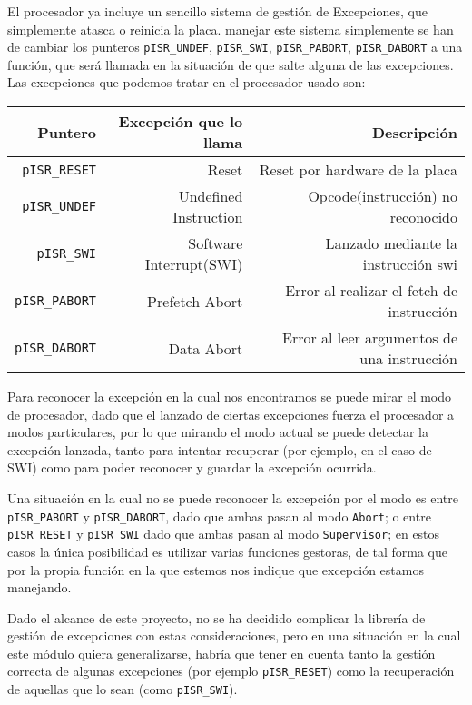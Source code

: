 \documentclass[12pt,letterpaper]{article}
\begin{document}
El procesador ya incluye un sencillo sistema de gestión de
Excepciones, que simplemente atasca o reinicia la placa. manejar este
sistema simplemente se han de cambiar los punteros
\texttt{pISR\_UNDEF}, \texttt{pISR\_SWI}, \texttt{pISR\_PABORT},
\texttt{pISR\_DABORT} a una función, que será llamada en la situación
de que salte alguna de las excepciones.
Las excepciones que podemos tratar en el procesador usado son:
  \begin{center}
    \begin{tabular}{ r | r | r}
      Puntero                & Excepción que lo llama  & Descripción                                 \\
      \hline
      \texttt{pISR\_RESET}   & Reset                   & Reset por hardware de la placa              \\
      \texttt{pISR\_UNDEF}   & Undefined Instruction   & Opcode(instrucción) no reconocido           \\
      \texttt{pISR\_SWI}     & Software Interrupt(SWI) & Lanzado mediante la instrucción swi         \\
      \texttt{pISR\_PABORT}  & Prefetch Abort          & Error al realizar el fetch de instrucción   \\
      \texttt{pISR\_DABORT}  & Data Abort              & Error al leer argumentos de una instrucción \\
    \end{tabular}
  \end{center}



Para reconocer la excepción en la cual nos encontramos se puede mirar
el modo de procesador, dado que el lanzado de ciertas excepciones
fuerza el procesador a modos particulares, por lo que mirando el modo
actual se puede detectar la excepción lanzada, tanto para intentar
recuperar (por ejemplo, en el caso de SWI) como para poder reconocer y
guardar la excepción ocurrida.

Una situación en la cual no se puede reconocer la excepción por el
modo es entre \texttt{pISR\_PABORT} y \texttt{pISR\_DABORT}, dado que
ambas pasan al modo \texttt{Abort}; o entre \texttt{pISR\_RESET} y
\texttt{pISR\_SWI} dado que ambas pasan al modo \texttt{Supervisor};
en estos casos la única posibilidad es utilizar varias funciones
gestoras, de tal forma que por la propia función en la que estemos nos
indique que excepción estamos manejando.

Dado el alcance de este proyecto, no se ha decidido complicar la
librería de gestión de excepciones con estas consideraciones, pero en
una situación en la cual este módulo quiera generalizarse, habría que
tener en cuenta tanto la gestión correcta de algunas excepciones (por
ejemplo \texttt{pISR\_RESET}) como la recuperación de aquellas que lo
sean (como \texttt{pISR\_SWI}).
\end{document}
